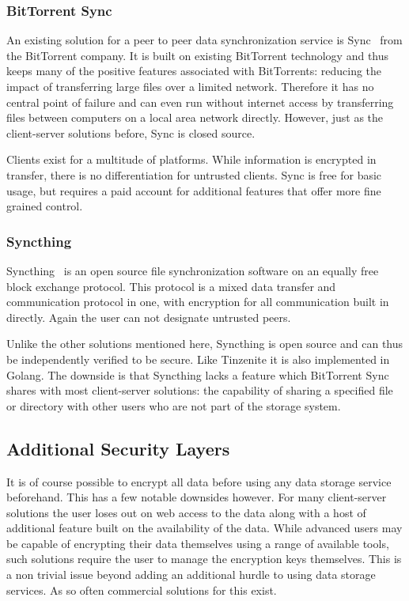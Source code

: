 \subsubsection{BitTorrent Sync}
\label{subs:BitTorrent Sync}

An existing solution for a peer to peer data synchronization service is Sync~\cite{web:site:bittorrent_sync} from the BitTorrent company.
It is built on existing BitTorrent technology and thus keeps many of the positive features associated with BitTorrents: reducing the impact of transferring large files over a limited network.
Therefore it has no central point of failure and can even run without internet access by transferring files between computers on a local area network directly.
However, just as the client-server solutions before, Sync is closed source.

Clients exist for a multitude of platforms.
While information is encrypted in transfer, there is no differentiation for untrusted clients.
Sync is free for basic usage, but requires a paid account for additional features that offer more fine grained control.

\subsubsection{Syncthing}
\label{subs:Syncthing}

Syncthing~\cite{web:site:synthing} is an open source file synchronization software on an equally free block exchange protocol.
This protocol is a mixed data transfer and communication protocol in one, with encryption for all communication built in directly.
Again the user can not designate untrusted peers.

Unlike the other solutions mentioned here, Syncthing is open source and can thus be independently verified to be secure.
Like Tinzenite it is also implemented in Golang.
The downside is that Syncthing lacks a feature which BitTorrent Sync shares with most client-server solutions: the capability of sharing a specified file or directory with other users who are not part of the storage system.

\subsection{Additional Security Layers}
\label{sub:Additional Security Layers}

It is of course possible to encrypt all data before using any data storage service beforehand.
This has a few notable downsides however.
For many client-server solutions the user loses out on web access to the data along with a host of additional feature built on the availability of the data.
While advanced users may be capable of encrypting their data themselves using a range of available tools, such solutions require the user to manage the encryption keys themselves.
This is a non trivial issue beyond adding an additional hurdle to using data storage services.
As so often commercial solutions for this exist.

